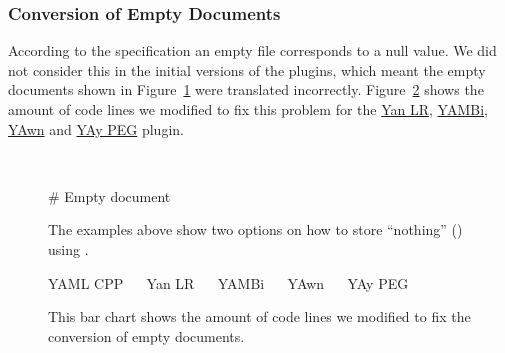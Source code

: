 \subsubsection{Conversion of Empty Documents}

According to the  specification an empty file corresponds to a null value. We did not consider this in the initial versions of the  plugins, which meant the empty documents shown in Figure~\ref{fig:null_yaml} were translated incorrectly. Figure~\ref{fig:empty_document_count} shows the amount of code lines we modified to fix this problem for the \href{https://issues.libelektra.org/2711}{Yan LR}, \href{https://issues.libelektra.org/2712}{YAMBi}, \href{https://issues.libelektra.org/2713}{YAwn} and \href{https://issues.libelektra.org/2714}{YAy PEG} plugin.

\begin{figure}[H]
  \centering
  \begin{minipage}[c]{0.48\textwidth}
    \begin{code-boxed}
      \vspace{10pt}
    \end{code-boxed}
  \end{minipage}
  \begin{minipage}[t]{0.02\textwidth}~\end{minipage}
  \begin{minipage}[c]{0.48\textwidth}
    \begin{yamlcode}
      # Empty document
    \end{yamlcode}
  \end{minipage}
  \caption{The examples above show two options on how to store “nothing” () using .}
  \label{fig:null_yaml}
\end{figure}

\begin{figure}[H]
  \begin{bchart}[max=20, width=0.8\textwidth, unit={~Lines of Code}]
  \end{bchart}
  \begin{center}
  \vspace{-0.5cm}
     YAML CPP ~~
     Yan LR ~~
     YAMBi ~~
     YAwn ~~
     YAy PEG
  \vspace{-0.5cm}
  \end{center}
  \caption{This bar chart shows the amount of code lines we modified to fix the conversion of empty documents.}
  \label{fig:empty_document_count}
\end{figure}


